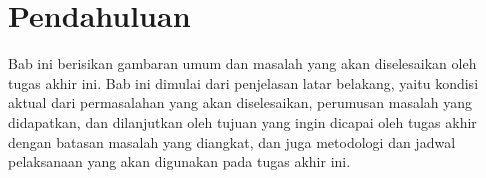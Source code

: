 \chapter{Pendahuluan}


Bab ini berisikan gambaran umum dan masalah yang akan diselesaikan oleh tugas akhir ini. Bab ini dimulai dari penjelasan latar belakang, yaitu kondisi aktual dari permasalahan yang akan diselesaikan, perumusan masalah yang didapatkan, dan dilanjutkan oleh tujuan yang ingin dicapai oleh tugas akhir dengan batasan masalah yang diangkat, dan juga metodologi dan jadwal pelaksanaan yang akan digunakan pada tugas akhir ini. 










